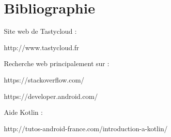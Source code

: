 \chapter{Bibliographie}
\label{sec:bibliographie}

Site web de Tastycloud : 

http://www.tastycloud.fr

Recherche web principalement sur : 

https://stackoverflow.com/

https://developer.android.com/

Aide Kotlin : 

http://tutos-android-france.com/introduction-a-kotlin/










